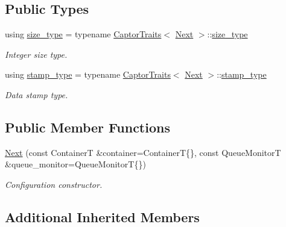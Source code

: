 \subsection*{Public Types}
\begin{DoxyCompactItemize}
\item 
\mbox{\label{classflow_1_1driver_1_1_next_a642dfa5c658efdc32d41b90fb71ea3a6}} 
using \hyperlink{classflow_1_1driver_1_1_next_a642dfa5c658efdc32d41b90fb71ea3a6}{size\+\_\+type} = typename \hyperlink{structflow_1_1_captor_traits}{Captor\+Traits}$<$ \hyperlink{classflow_1_1driver_1_1_next}{Next} $>$\+::\hyperlink{classflow_1_1driver_1_1_next_a642dfa5c658efdc32d41b90fb71ea3a6}{size\+\_\+type}
\begin{DoxyCompactList}\small\item\em Integer size type. \end{DoxyCompactList}\item 
\mbox{\label{classflow_1_1driver_1_1_next_ac011d6eebb7dd89de890c09295f98613}} 
using \hyperlink{classflow_1_1driver_1_1_next_ac011d6eebb7dd89de890c09295f98613}{stamp\+\_\+type} = typename \hyperlink{structflow_1_1_captor_traits}{Captor\+Traits}$<$ \hyperlink{classflow_1_1driver_1_1_next}{Next} $>$\+::\hyperlink{classflow_1_1driver_1_1_next_ac011d6eebb7dd89de890c09295f98613}{stamp\+\_\+type}
\begin{DoxyCompactList}\small\item\em Data stamp type. \end{DoxyCompactList}\end{DoxyCompactItemize}
\subsection*{Public Member Functions}
\begin{DoxyCompactItemize}
\item 
\hyperlink{classflow_1_1driver_1_1_next_a1313d1526a137be521b64bc9758a809e}{Next} (const ContainerT \&container=ContainerT\{\}, const Queue\+MonitorT \&queue\+\_\+monitor=Queue\+MonitorT\{\})
\begin{DoxyCompactList}\small\item\em Configuration constructor. \end{DoxyCompactList}\end{DoxyCompactItemize}
\subsection*{Additional Inherited Members}



